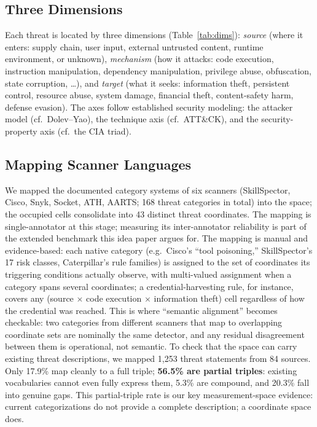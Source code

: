 \documentclass[sigconf,nonacm]{acmart}
\begin{document}
\subsection{Three Dimensions}
Each threat is located by three dimensions (Table~\ref{tab:dims}): \emph{source} (where it enters: supply chain, user input, external untrusted content, runtime environment, or unknown), \emph{mechanism} (how it attacks: code execution, instruction manipulation, dependency manipulation, privilege abuse, obfuscation, state corruption, \ldots), and \emph{target} (what it seeks: information theft, persistent control, resource abuse, system damage, financial theft, content-safety harm, defense evasion). The axes follow established security modeling: the attacker model (cf.\ Dolev--Yao), the technique axis (cf.\ ATT\&CK), and the security-property axis (cf.\ the CIA triad).

\subsection{Mapping Scanner Languages}
We mapped the documented category systems of six scanners (SkillSpector, Cisco, Snyk, Socket, ATH, AARTS; 168 threat categories in total) into the space; the occupied cells consolidate into 43 distinct threat coordinates. The mapping is single-annotator at this stage; measuring its inter-annotator reliability is part of the extended benchmark this idea paper argues for. The mapping is manual and evidence-based: each native category (e.g.\ Cisco's ``tool poisoning,'' SkillSpector's 17 risk classes, Caterpillar's rule families) is assigned to the set of coordinates its triggering conditions actually observe, with multi-valued assignment when a category spans several coordinates; a credential-harvesting rule, for instance, covers any (source $\times$ code execution $\times$ information theft) cell regardless of how the credential was reached. This is where ``semantic alignment'' becomes checkable: two categories from different scanners that map to overlapping coordinate sets are nominally the same detector, and any residual disagreement between them is operational, not semantic. To check that the space can carry existing threat descriptions, we mapped 1{,}253 threat statements from 84 sources. Only 17.9\% map cleanly to a full triple; \textbf{56.5\% are partial triples}: existing vocabularies cannot even fully express them, 5.3\% are compound, and 20.3\% fall into genuine gaps. This partial-triple rate is our key measurement-space evidence: current categorizations do not provide a complete description; a coordinate space does.
\end{document}

